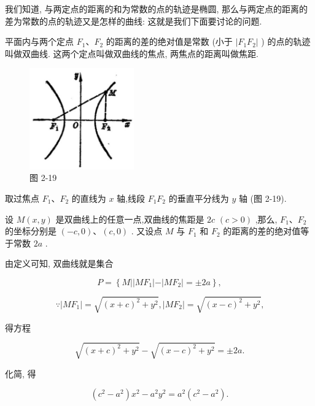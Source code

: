 \documentclass[lang=cn,newtx,10pt,scheme=chinese]{elegantbook}
\begin{document}
我们知道, 与两定点的距离的和为常数的点的轨迹是椭圆, 那么与两定点的距离的差为常数的点的轨迹又是怎样的曲线: 这就是我们下面要讨论的问题.
\begin{definition}[双曲线] 
平面内与两个定点 \({F}_{1}\text{、}{F}_{2}\) 的距离的差的绝对值是常数 (小于 \(\left| {{F}_{1}{F}_{2}}\right|\) ) 的点的轨迹叫做双曲线. 这两个定点叫做双曲线的焦点, 两焦点的距离叫做焦距.
\end{definition}

\begin{figure}[h]
  \centering
  \includegraphics[max width=0.4\textwidth]{images/01912cc2-ffb6-728e-9ae7-b113ff05c64b_97_983208.jpg}
  \caption{图 2-19}
\end{figure}



取过焦点 \({F}_{1}\text{、}{F}_{2}\) 的直线为 \(x\) 轴,线段 \({F}_{1}{F}_{2}\) 的垂直平分线为 \(y\) 轴 (图 2-19).

设 \(M\left( {x,y}\right)\) 是双曲线上的任意一点,双曲线的焦距是 \({2c}\) \(\left( {c > 0}\right)\) ,那么, \({F}_{1}\text{、}{F}_{2}\) 的坐标分别是 \(\left( {-c,0}\right) \text{、}\left( {c,0}\right)\) . 又设点 \(M\) 与 \({F}_{1}\) 和 \({F}_{2}\) 的距离的差的绝对值等于常数 \({2a}\) .

由定义可知, 双曲线就是集合

\[
  P = \left\{ {M\left| \right| M{F}_{1}\left| -\right| M{F}_{2} \mid = \pm {2a}}\right\} ,
\]

\[
  \because \left| {M{F}_{1}}\right| = \sqrt{{\left( x + c\right) }^{2} + {y}^{2}},\left| {M{F}_{2}}\right| = \sqrt{{\left( x - c\right) }^{2} + {y}^{2}}\text{,}
\]

得方程

\[
  \sqrt{{\left( x + c\right) }^{2} + {y}^{2}} - \sqrt{{\left( x - c\right) }^{2} + {y}^{2}} = \pm {2a}.
\]

化简, 得

\[
  \left( {{c}^{2} - {a}^{2}}\right) {x}^{2} - {a}^{2}{y}^{2} = {a}^{2}\left( {{c}^{2} - {a}^{2}}\right) .
\]
\end{document}
